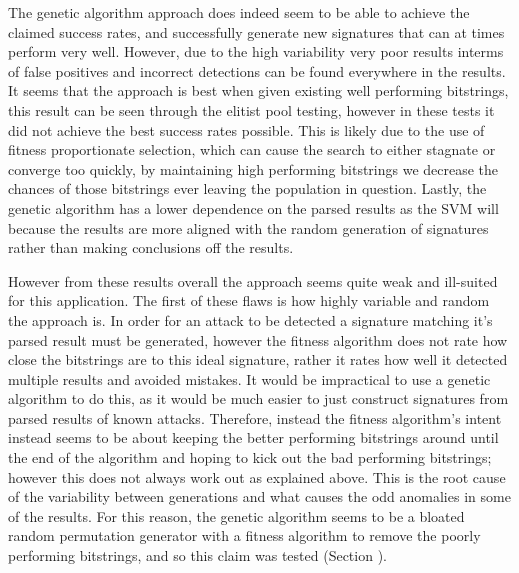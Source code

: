 The genetic algorithm approach does indeed seem to be able to achieve the claimed success rates, and successfully generate new signatures that can at times perform very well.  However, due to the high variability very poor results interms of false positives and incorrect detections can be found everywhere in the results.  It seems that the approach is best when given existing well performing bitstrings, this result can be seen through the elitist pool testing, however in these tests it did not achieve the best success rates possible.  This is likely due to the use of fitness proportionate selection, which can cause the search to either stagnate or converge too quickly, by maintaining high performing bitstrings we decrease the chances of those bitstrings ever leaving the population in question. %
Lastly, the genetic algorithm has a lower dependence on the parsed results as the SVM will because the results are more aligned with the random generation of signatures rather than making conclusions off the results.

However from these results overall the approach seems quite weak and ill-suited for this application.  The first of these flaws is how highly variable and random the approach is.  In order for an attack to be detected a signature matching it's parsed result must be generated, however the fitness algorithm does not rate how close the bitstrings are to this ideal signature, rather it rates how well it detected multiple results and avoided mistakes.  It would be impractical to use a genetic algorithm to do this, as it would be much easier to just construct signatures from parsed results of known attacks.  Therefore, instead the fitness algorithm's intent instead seems to be about keeping the better performing bitstrings around until the end of the algorithm and hoping to kick out the bad performing bitstrings; however this does not always work out as explained above.  This is the root cause of the variability between generations and what causes the odd anomalies in some of the results.  For this reason, the genetic algorithm seems to be a bloated random permutation generator with a fitness algorithm to remove the poorly performing bitstrings, and so this claim was tested (Section \label{sec:randDiscussion}).

